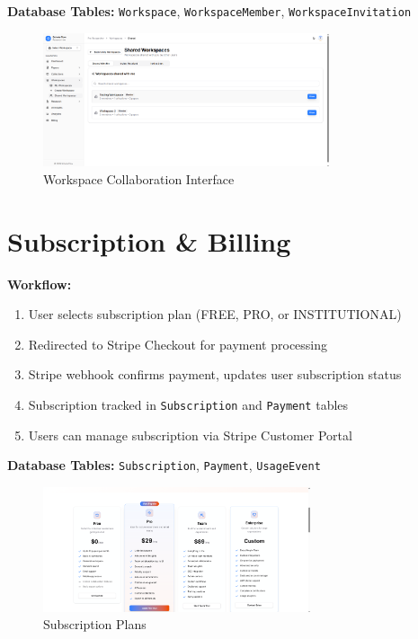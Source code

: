 \textbf{Database Tables:} \texttt{Workspace}, \texttt{WorkspaceMember}, \texttt{WorkspaceInvitation}

\begin{figure}[H]
\centering
\includegraphics[width=0.75\textwidth]{images/screenshots/shared_workspace.png}
\caption{Workspace Collaboration Interface}
\label{fig:workspace}
\end{figure}

\section{Subscription \& Billing}

\textbf{Workflow:}
\begin{enumerate}[leftmargin=*,topsep=3pt,itemsep=2pt]
    \item User selects subscription plan (FREE, PRO, or INSTITUTIONAL)
    \item Redirected to Stripe Checkout for payment processing
    \item Stripe webhook confirms payment, updates user subscription status
    \item Subscription tracked in \texttt{Subscription} and \texttt{Payment} tables
    \item Users can manage subscription via Stripe Customer Portal
\end{enumerate}

\textbf{Database Tables:} \texttt{Subscription}, \texttt{Payment}, \texttt{UsageEvent}

\begin{figure}[H]
\centering
\includegraphics[width=0.7\textwidth]{images/screenshots/billing_plan.png}
\caption{Subscription Plans}
\label{fig:billing}
\end{figure}

